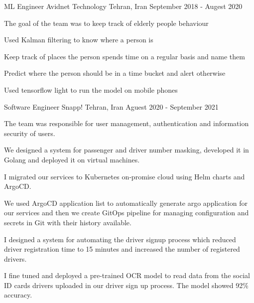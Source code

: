 
\begin{cventries}

  \cventry
    {ML Engineer} %
    {Avidnet Technology} %
    {Tehran, Iran} %
    {September 2018 - Augest 2020} %
    {
      \begin{cvitems}
        \item The goal of the team was to keep track of elderly people behaviour 
        \item Used Kalman filtering to know where a person is
        \item Keep track of places the person spends time on a regular basis and name them
        \item Predict where the person should be in a time bucket and alert otherwise
        \item Used tensorflow light to run the model on mobile phones
      \end{cvitems}
    }

  \cventry
    {Software Engineer} %
    {Snapp!} %
    {Tehran, Iran} %
    {Aguest 2020 - September 2021} %
    {
      \begin{cvitems} %
        \item The team was responsible for user management, authentication and information security of users.
        \item We designed a system for passenger and driver number masking, developed it in Golang and deployed it on virtual machines.
        \item I migrated our services to Kubernetes on‐promise cloud using Helm charts and ArgoCD.
        \item We used ArgoCD application list to automatically generate argo application for our services and then we create GitOps pipeline for managing configuration and secrets in Git with their history available.
        \item I designed a system for automating the driver signup process which reduced driver registration time to 15 minutes and increased the number of registered drivers.
        \item I fine tuned and deployed a pre-trained OCR model to read data from the social ID cards drivers uploaded in our driver sign up process. The model showed 92\% accuracy.
      \end{cvitems}
    }


\end{cventries}
